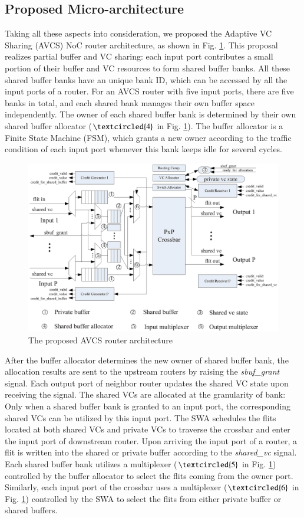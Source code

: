 \documentclass[paper]{ieice}
\begin{document}
\subsection{Proposed Micro-architecture}
Taking all these aspects into consideration, we proposed the Adaptive VC Sharing (AVCS) NoC router architecture, as shown in Fig. \ref{architecture}. This proposal realizes partial buffer and VC sharing: each input port contributes a small portion of their buffer and VC resources to form shared buffer banks. All these shared buffer banks have an unique bank ID, which can be accessed by all the input ports of a router. For an AVCS router with five input ports, there are five banks in total, and each shared bank manages their own buffer space independently. The owner of each shared buffer bank is determined by their own shared buffer allocator ($\textcircled{4}$ in Fig. \ref{architecture}). The buffer allocator is a Finite State Machine (FSM), which grants a new owner according to the traffic condition of each input port whenever this bank keeps idle for several cycles.
\begin{figure}
  \centering
  \includegraphics[scale=0.4]{figures/architecture.eps}
  \caption{The proposed AVCS router architecture}\label{architecture}
\end{figure}

After the buffer allocator determines the new owner of shared buffer bank, the allocation results are sent to the upstream routers by raising the \emph{sbuf\_grant} signal. Each output port of neighbor router updates the shared VC state upon receiving the signal. The shared VCs are allocated at the granularity of bank: Only when a shared buffer bank is granted to an input port, the corresponding shared VCs can be utilized by this input port. The SWA schedules the flits located at both shared VCs and private VCs to traverse the crossbar and enter the input port of downstream router. Upon arriving the input port of a router, a flit is written into the shared or private buffer according to the \emph{shared\_vc} signal. Each shared buffer bank utilizes a multiplexer ($\textcircled{5}$ in Fig. \ref{architecture}) controlled by the buffer allocator to select the flits coming from the owner port. Similarly, each input port of the crossbar uses a multiplexer ($\textcircled{6}$ in Fig. \ref{architecture}) controlled by the SWA to select the flits from either private buffer or shared buffers.
\end{document}
